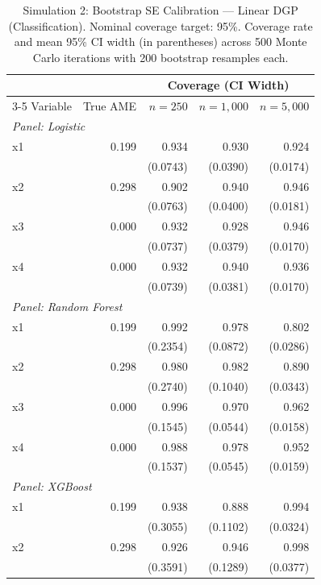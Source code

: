 \begin{table}[htbp]
\centering
\small
\begin{threeparttable}
\caption{Simulation 2: Bootstrap SE Calibration --- Linear DGP (Classification). Nominal coverage target: 95\%. Coverage rate and mean 95\% CI width (in parentheses) across 500 Monte Carlo iterations with 200 bootstrap resamples each.}
\label{tab:sim2_calibration_linear}
\begin{tabular}{lrrrr}
\toprule
 & & \multicolumn{3}{c}{Coverage (CI Width)} \\
\cmidrule(lr){3-5}
Variable & True AME & $n=250$ & $n=1,000$ & $n=5,000$ \\
\midrule
\multicolumn{5}{l}{\textit{Panel: Logistic}} \\
\quad x1 & 0.199 & 0.934 & 0.930 & 0.924 \\
 &  & (0.0743) & (0.0390) & (0.0174) \\
\quad x2 & 0.298 & 0.902 & 0.940 & 0.946 \\
 &  & (0.0763) & (0.0400) & (0.0181) \\
\quad x3 & 0.000 & 0.932 & 0.928 & 0.946 \\
 &  & (0.0737) & (0.0379) & (0.0170) \\
\quad x4 & 0.000 & 0.932 & 0.940 & 0.936 \\
 &  & (0.0739) & (0.0381) & (0.0170) \\
\midrule
\multicolumn{5}{l}{\textit{Panel: Random Forest}} \\
\quad x1 & 0.199 & 0.992 & 0.978 & 0.802 \\
 &  & (0.2354) & (0.0872) & (0.0286) \\
\quad x2 & 0.298 & 0.980 & 0.982 & 0.890 \\
 &  & (0.2740) & (0.1040) & (0.0343) \\
\quad x3 & 0.000 & 0.996 & 0.970 & 0.962 \\
 &  & (0.1545) & (0.0544) & (0.0158) \\
\quad x4 & 0.000 & 0.988 & 0.978 & 0.952 \\
 &  & (0.1537) & (0.0545) & (0.0159) \\
\midrule
\multicolumn{5}{l}{\textit{Panel: XGBoost}} \\
\quad x1 & 0.199 & 0.938 & 0.888 & 0.994 \\
 &  & (0.3055) & (0.1102) & (0.0324) \\
\quad x2 & 0.298 & 0.926 & 0.946 & 0.998 \\
 &  & (0.3591) & (0.1289) & (0.0377) \\

\end{tabular}
\end{threeparttable}
\end{table}

